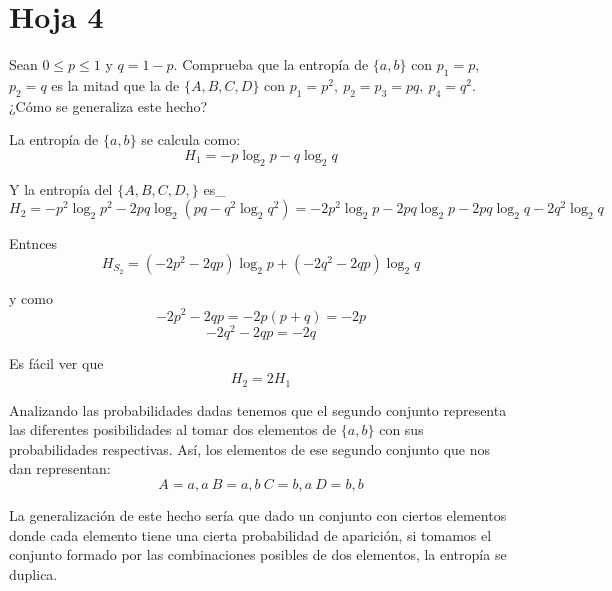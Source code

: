\section{Hoja 4}
\begin{problem}[1]
	Sean $0 \leq p \leq 1$ y $q =1-p$. Comprueba que la entropía de $\{a,b\}$ con $p_1=p$, $p_2=q$ es la mitad que la de $\{A,B,C,D\}$ con $p_1=p^2, \ p_2=p_3=pq, \ p_4=q^2$. ¿Cómo se generaliza este hecho?
	\solution

	La entropía de $\{a,b\}$ se calcula como:
	$$H_1 = -p \log_2 p - q \log_2q$$

	Y la entropía del $\{A,B,C,D,\}$ es_
	$$H_{2} = -p^2\log_2 p^2 - 2pq\log_2(pq - q^2\log_2 q^2) = -2p^2\log_2 p - 2pq\log_2p - 2pq\log_2q - 2q^2\log_2q$$

	Entnces
	$$H_{S_2}= (-2p^2-2qp)\log_2p + (-2q^2 - 2qp)\log_2q$$

	y como
	$$-2p^2-2qp= -2p(p+q) = -2p$$
	$$-2q^2 - 2qp = -2q$$

	Es fácil ver que $$H_{2} = 2H_1$$

	\yoP

	Analizando las probabilidades dadas tenemos que el segundo conjunto representa las diferentes posibilidades al tomar dos elementos de $\{a,b\}$ con sus probabilidades respectivas. Así, los elementos de ese segundo conjunto que nos dan representan:
	\[A= a,a \ B=a,b \ C=b,a \ D=b,b\]

	La generalización de este hecho sería que dado un conjunto con ciertos elementos donde cada elemento tiene una cierta probabilidad de aparición, si tomamos el conjunto formado por las combinaciones posibles de dos elementos, la entropía se duplica.

\end{problem}
